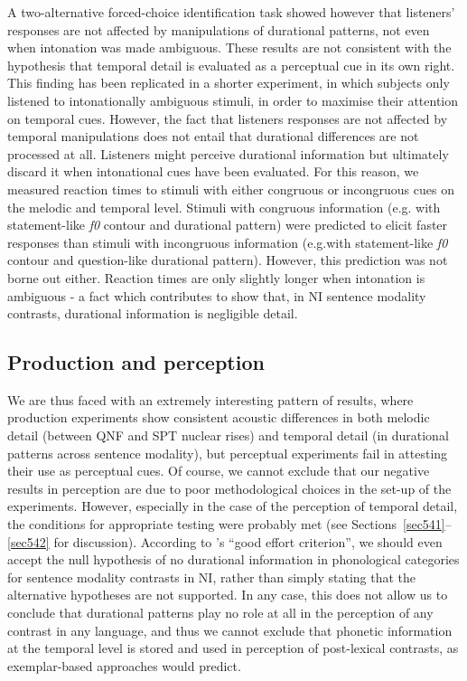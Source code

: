 A two-alternative forced-choice identification task showed however that listeners' responses are not affected by manipulations of durational patterns, not even when intonation was made ambiguous. These results are not consistent with the hypothesis that temporal detail is evaluated as a perceptual cue in its own right. This finding has been replicated in a shorter experiment, in which subjects only listened to intonationally ambiguous stimuli, in order to maximise their attention on temporal cues. However, the fact that listeners responses are not affected by temporal manipulations does not entail that durational differences are not processed at all. Listeners might perceive durational information but ultimately discard it when intonational cues have been evaluated. For this reason, we measured reaction times to stimuli with either congruous or incongruous cues on the melodic and temporal level. Stimuli with congruous information (e.g. with statement-like \textit{f0} contour and durational pattern) were predicted to elicit faster responses than stimuli with incongruous information (e.g.with statement-like \textit{f0} contour and question-like durational pattern). However, this prediction was not borne out either. Reaction times are only slightly longer when intonation is ambiguous - a fact which contributes to show that, in NI sentence modality contrasts, durational information is negligible detail.

\subsection{Production and perception}\label{sec613}
We are thus faced with an extremely interesting pattern of results, where production experiments show consistent acoustic differences in both melodic detail (between QNF and SPT nuclear rises) and temporal detail (in durational patterns across sentence modality), but perceptual experiments fail in attesting their use as perceptual cues. Of course, we cannot exclude that our negative results in perception are due to poor methodological choices in the set-up of the experiments. However, especially in the case of the perception of temporal detail, the conditions for appropriate testing were probably met (see Sections~\ref{sec541}--\ref{sec542} for discussion). According to \citeauthor{frick1995accepting}'s \citeyear{frick1995accepting} ``good effort criterion'', we should even accept the null hypothesis of no durational information in phonological categories for sentence modality contrasts in NI, rather than simply stating that the alternative hypotheses are not supported. In any case, this does not allow us to conclude that durational patterns play no role at all in the perception of any contrast in any language, and thus we cannot exclude that phonetic information at the temporal level is stored and used in perception of post-lexical contrasts, as exemplar-based approaches would predict.

